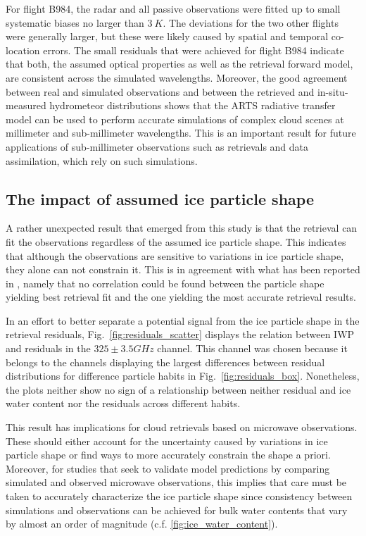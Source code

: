 \documentclass[journal abbreviation, manuscript]{copernicus}
\begin{document}
 For flight B984, the radar and all passive observations were fitted up to small
 systematic biases no larger than $3\ \unit{K}$. The deviations for the two
 other flights were generally larger, but these were likely caused by spatial
 and temporal co-location errors. The small residuals that were achieved for
 flight B984 indicate that both, the assumed optical properties as well as the
 retrieval forward model, are consistent across the simulated wavelengths.
 Moreover, the good agreement between real and simulated observations and
 between the retrieved and in-situ-measured hydrometeor distributions shows that
 the ARTS radiative transfer model can be used to perform accurate simulations
 of complex cloud scenes at millimeter and sub-millimeter wavelengths. This is
 an important result for future applications of sub-millimeter observations such
 as retrievals and data assimilation, which rely on such simulations.


\subsection{The impact of assumed ice particle shape}

A rather unexpected result that emerged from this study is that the retrieval
can fit the observations regardless of the assumed ice particle shape. This
indicates that although the observations are sensitive to variations in ice
particle shape, they alone can not constrain it. This is in agreement with what
has been reported in \citet{pfreundschuh19}, namely that no correlation could be
found between the particle shape yielding best retrieval fit and the one
yielding the most accurate retrieval results.

In an effort to better separate a potential signal from the ice particle shape
in the retrieval residuals, Fig.~\ref{fig:residuals_scatter} displays the
relation between IWP and residuals in the $325 \pm 3.5 \unit{GHz}$ channel. This
channel was chosen because it belongs to the channels displaying the largest
differences between residual distributions for difference particle habits in
Fig.~\ref{fig:residuals_box}. Nonetheless, the plots neither show no sign of a
relationship between neither residual and ice water content nor the residuals
across different habits.

This result has implications for cloud retrievals based on microwave
observations. These should either account for the uncertainty caused by
variations in ice particle shape or find ways to more accurately constrain the
shape a priori. Moreover, for studies that seek to validate model predictions by
comparing simulated and observed microwave observations, this implies that care
must be taken to accurately characterize the ice particle shape since
consistency between simulations and observations can be achieved for bulk water
contents that vary by almost an order of magnitude (c.f.
\ref{fig:ice_water_content}).
\end{document}
